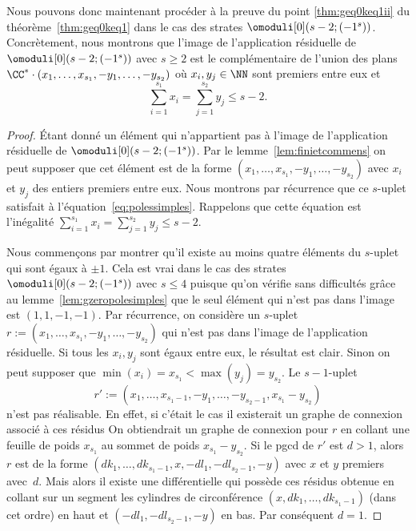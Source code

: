 Nous pouvons donc maintenant procéder à la preuve du point \eqref{thm:geq0keq1ii} du théorème~\ref{thm:geq0keq1} dans le cas des strates $\omoduli[0](s-2;(-1^{s}))$. Concrètement, nous montrons que l'image de l'application résiduelle de $\omoduli[0](s-2;(-1^{s}))$ avec $s\geq2$ est le complémentaire de l'union des plans $\CC^{\ast} \cdot (x_{1},\dots,x_{s_{1}},-y_{1},\dots,-y_{s_{2}})$ où $x_{i},y_{j} \in \NN$ sont premiers entre eux et
\begin{equation*}
\sum_{i=1}^{s_{1}} x_{i} = \sum_{j=1}^{s_{2}} y_{j} \leq s-2.
\end{equation*}
\begin{proof}
Étant donné un élément qui n’appartient pas à l'image de l'application résiduelle de $\omoduli[0](s-2;(-1^{s}))$. Par le lemme~\ref{lem:finietcommens} on peut supposer que cet élément est de la forme $(x_{1},\dots,x_{s_{1}},-y_{1},\dots,-y_{s_{2}})$ avec $x_{i}$ et $y_{j}$ des entiers premiers entre eux. Nous montrons par récurrence que ce $s$-uplet satisfait à l'équation~\eqref{eq:polessimples}.
Rappelons que cette équation est l'inégalité $\sum_{i=1}^{s_{1}} x_{i} = \sum_{j=1}^{s_{2}} y_{j} \leq s-2$.

Nous commençons par montrer qu'il existe au moins quatre éléments du $s$-uplet qui sont égaux à $\pm1$. Cela est vrai dans le cas des strates $\omoduli[0](s-2;(-1^{s}))$ avec $s\leq 4$ puisque qu'on vérifie sans difficultés grâce au lemme~\ref{lem:gzeropolesimples} que le seul élément qui n'est pas dans l'image est $(1,1,-1,-1)$. Par récurrence, on considère un $s$-uplet $r := (x_{1},\dots,x_{s_{1}},-y_{1},\dots,-y_{s_{2}})$ qui n'est pas dans l'image de l'application résiduelle. Si tous les $x_{i},y_{j}$ sont égaux entre eux, le résultat est clair. Sinon on peut supposer que $\min(x_{i}) = x_{s_{1}} < \max(y_{j}) = y_{s_{2}}$. Le $s-1$-uplet\vspace*{-3pt}\enlargethispage{.5\baselineskip}
\[
r' :=(x_{1},\dots,x_{s_{1}-1},-y_{1},\dots,-y_{s_{2}-1},x_{s_{1}}-y_{s_{2}})
\]
n'est pas réalisable. En effet, si c'était le cas il existerait un graphe de connexion associé à ces résidus On obtiendrait un graphe de connexion pour $r$ en collant une feuille de poids $x_{s_{1}}$ au sommet de poids $x_{s_{1}}-y_{s_{2}}$. Si le pgcd de $r'$ est $d > 1$, alors~$r$ est de la forme $(dk_{1},\dots,dk_{s_{1}-1},x,-dl_{1},-dl_{s_{2}-1},-y)$ avec $x$ et $y$ premiers avec~$d$. Mais alors il existe une différentielle qui possède ces résidus obtenue en collant sur un segment les cylindres de circonférence $(x,dk_{1},\dots,dk_{s_{1}-1})$ (dans cet ordre) en haut et $(-dl_{1},-dl_{s_{2}-1},-y)$ en bas. Par conséquent $d=1$.


\end{proof}
